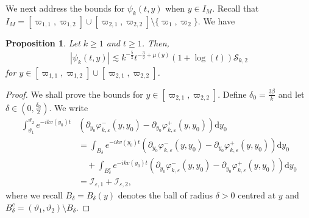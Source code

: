 \documentclass[11pt,reqno]{amsproc}
\newtheorem{proposition}{Proposition}[section]
\theoremstyle{definition}
\numberwithin{equation}{section}
\newcommand{\cI}{{\mathcal I}}
\newcommand{\cS}{{\mathcal S}}
\renewcommand{\d}{\mathrm{d}}
\newcommand{\ep}{\varepsilon}
\begin{document}
We next address the bounds for $\psi_k(t,y)$ when $y\in I_M$. Recall that $I_M = [\varpi_{1,1}, \varpi_{1,2}]\cup [\varpi_{2,1} , \varpi_{2,2}] \setminus \lbrace \varpi_1, \varpi_2 \rbrace$. We have

\begin{proposition}\label{prop:IDpsimild}
Let $k\geq 1$ and $t\geq 1$. Then, 
\begin{align*}
\left| \psi_k(t,y) \right| \lesssim k^{-\frac52}t^{-\frac32 + \mu(y)}(1+ \log(t))\cS_{k,2}
\end{align*}
for $y\in [\varpi_{1,1}, \varpi_{1,2}]\cup [\varpi_{2,1}, \varpi_{2,2}]$.
\end{proposition}

\begin{proof}
We shall prove the bounds for $y\in [\varpi_{2,1},\varpi_{2,2}]$. Define $\delta_0 =  \frac{3\beta}{k}$ and let $\delta\in (0, \frac{\delta_0}{2})$. We write
\begin{align*}
\int_{\vartheta_1}^{\vartheta_2} e^{-ikv(y_0)t} & \left( \partial_{y_0}\varphi_{k,\ep}^-(y,y_0) - \partial_{y_0}\varphi_{k,\ep}^+(y,y_0) \right) \d y_0 \\
&= \int_{B_\delta} e^{-ikv(y_0)t} \left( \partial_{y_0}\varphi_{k,\ep}^-(y,y_0) - \partial_{y_0}\varphi_{k,\ep}^+(y,y_0) \right) \d y_0\\
&\quad + \int_{B_\delta^c} e^{-ikv(y_0)t} \left( \partial_{y_0}\varphi_{k,\ep}^-(y,y_0) - \partial_{y_0}\varphi_{k,\ep}^+(y,y_0) \right) \d y_0\\
&= \cI_{\ep,1} + \cI_{\ep,2},
\end{align*}
where we recall $B_\delta=B_\delta(y)$ denotes the ball of radius $\delta>0$ centred at $y$ and $B_\delta^c = (\vartheta_1, \vartheta_2)\setminus B_\delta$.


\end{proof}
\end{document}
